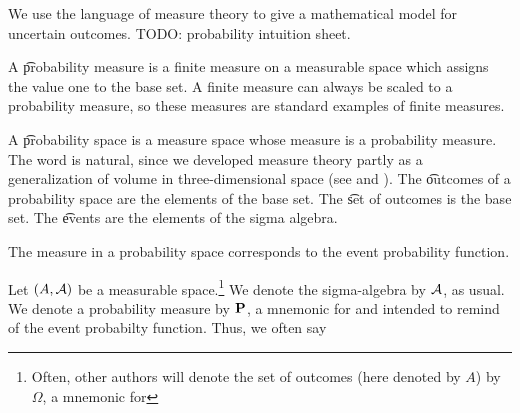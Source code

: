 

We use the language of measure theory to give a mathematical model for uncertain outcomes.
TODO: probability intuition sheet.


A \t{probability measure} is a finite measure on a measurable space which assigns the value one to the base set.
A finite measure can always be scaled to a probability measure, so these measures are standard examples of finite measures.

A \t{probability space} is a measure space whose measure is a probability measure.
The word  is natural, since we developed measure theory partly as a generalization of volume in three-dimensional space (see  and ).
The \t{outcomes} of a probability space are the elements of the base set.
The \t{set of outcomes} is the base set.
The \t{events} are the elements of the sigma algebra.

The measure in a probability space corresponds to the event probability function.


Let $(A, \mathcal{A})$ be a measurable space.\footnote{Often, other authors will denote the set of outcomes (here denoted by $A$) by $\Omega$, a mnemonic for }
We denote the sigma-algebra by $\mathcal{A}$, as usual.
We denote a probability measure by $\mathbf{P}$, a mnemonic for  and intended to remind of the event probabilty function.
Thus, we often say 


